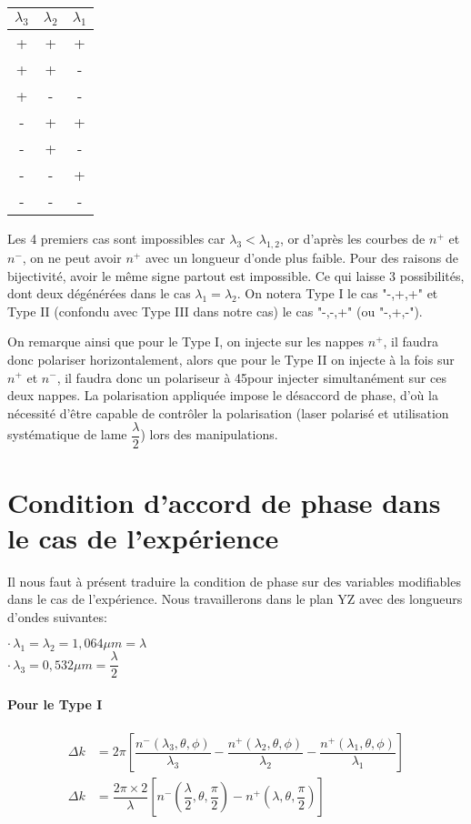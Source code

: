 \documentclass[a4paper,11pt]{report}
\begin{document}
\begin{center}
\begin{tabular}{|c|c|c|}
$\lambda_3$&$\lambda_2$&$\lambda_1$\\
\hline
+&+&+\\
+&+&-\\
+&-&-\\
\hline
-&+&+\\
-&+&-\\
-&-&+\\
\hline
-&-&-\\
\end{tabular}
\end{center}

Les 4 premiers cas sont impossibles car $\lambda_3<\lambda_{1,2}$, or d'après les courbes de $n^+$ et $n^-$, on ne peut avoir $n^+$ avec un longueur d'onde plus faible. Pour des raisons de bijectivité, avoir le même signe partout est impossible. Ce qui laisse 3 possibilités, dont deux dégénérées dans le cas $\lambda_1=\lambda_2$. On notera Type I le cas "-,+,+" et Type II (confondu avec Type III dans notre cas) le cas "-,-,+" (ou "-,+,-").

On remarque ainsi que pour le Type I, on injecte sur les nappes $n^+$, il faudra donc polariser horizontalement, alors que pour le Type II on injecte à la fois sur $n^+$ et $n^-$, il faudra donc un polariseur à 45\textdegree pour injecter simultanément sur ces deux nappes. La polarisation appliquée impose le désaccord de phase, d'où la nécessité d'être capable de contrôler la polarisation (laser polarisé et utilisation systématique de lame $\dfrac{\lambda}{2}$) lors des manipulations.

\section{Condition d'accord de phase dans le cas de l'expérience}

Il nous faut à présent traduire la condition de phase sur des variables modifiables dans le cas de l'expérience. Nous travaillerons dans le plan YZ avec des longueurs d'ondes suivantes:

\indent$\cdot\,\lambda_1=\lambda_2=1,064\mu m=\lambda$\\
\indent$\cdot\,\lambda_3=0,532\mu m=\dfrac{\lambda}{2}$\\

\paragraph{Pour le Type I}
\begin{align*}
\Delta k&=2\pi\left[\dfrac{n^-(\lambda_3,\theta,\phi)}{\lambda_3}-\dfrac{n^+(\lambda_2,\theta,\phi)}{\lambda_2}-\dfrac{n^+(\lambda_1,\theta,\phi)}{\lambda_1}\right]\\
\Delta k&=\dfrac{2\pi\times 2}{\lambda}\left[n^-\left(\dfrac{\lambda}{2},\theta,\dfrac{\pi}{2}\right)-n^+\left(\lambda,\theta,\dfrac{\pi}{2}\right)\right]
\end{align*}
\end{document}
